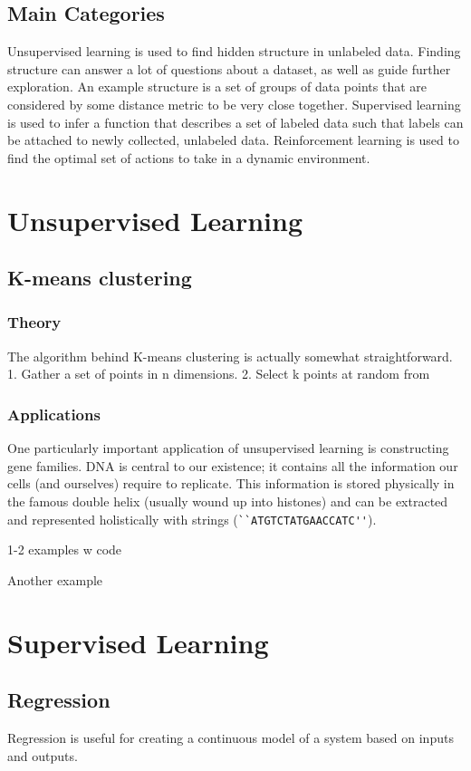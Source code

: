\documentclass[11pt]{article}
\begin{document}
\subsection{Main Categories}
Unsupervised learning is used to find hidden structure in unlabeled data.
Finding structure can answer a lot of questions about a dataset, as well as guide further exploration. An example structure is a set of groups of data points that are considered by some distance metric to be very close together.
Supervised learning is used to infer a function that describes a set of labeled data such that labels can be attached to newly collected, unlabeled data.
Reinforcement learning is used to find the optimal set of actions to take in a dynamic environment.

\section{Unsupervised Learning}
\subsection{K-means clustering}
\subsubsection{Theory}
The algorithm behind K-means clustering is actually somewhat straightforward.
1. Gather a set of points in n dimensions.
2. Select k points at random from 
\subsubsection{Applications}
One particularly important application of unsupervised learning is constructing gene families. DNA is central to our existence; it contains all the information our cells (and ourselves) require to replicate. This information is stored physically in the famous double helix (usually wound up into histones) and can be extracted and represented holistically with strings (\verb|``ATGTCTATGAACCATC''|).

1-2 examples w code

Another example 

\section{Supervised Learning}
\subsection{Regression}
Regression is useful for creating a continuous model of a system based on inputs and outputs.
\end{document}

